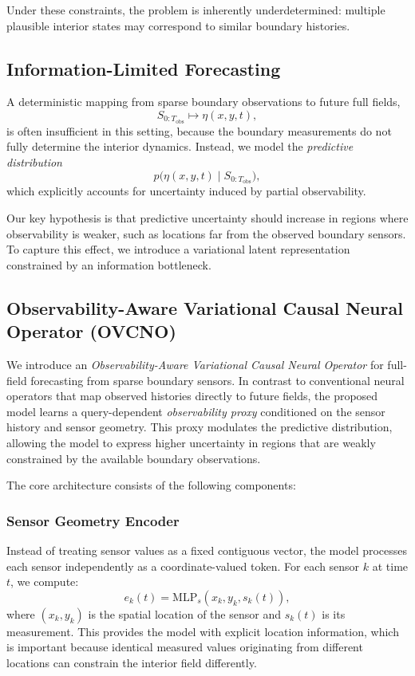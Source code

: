 \documentclass[11pt,a4paper]{article}
\begin{document}
Under these constraints, the problem is inherently underdetermined: multiple plausible interior states may correspond to similar boundary histories.

\subsection{Information-Limited Forecasting}

A deterministic mapping from sparse boundary observations to future full fields,
\begin{equation}
S_{0:T_{\mathrm{obs}}} \mapsto \eta(x,y,t),
\end{equation}
is often insufficient in this setting, because the boundary measurements do not fully determine the interior dynamics. Instead, we model the \emph{predictive distribution}
\begin{equation}
p\bigl(\eta(x,y,t)\mid S_{0:T_{\mathrm{obs}}}\bigr),
\end{equation}
which explicitly accounts for uncertainty induced by partial observability.

Our key hypothesis is that predictive uncertainty should increase in regions where observability is weaker, such as locations far from the observed boundary sensors. To capture this effect, we introduce a variational latent representation constrained by an information bottleneck.

\subsection{Observability-Aware Variational Causal Neural Operator (OVCNO)}

We introduce an \emph{Observability-Aware Variational Causal Neural Operator} for full-field forecasting from sparse boundary sensors. In contrast to conventional neural operators that map observed histories directly to future fields, the proposed model learns a query-dependent \emph{observability proxy} conditioned on the sensor history and sensor geometry. This proxy modulates the predictive distribution, allowing the model to express higher uncertainty in regions that are weakly constrained by the available boundary observations.

The core architecture consists of the following components:

\subsubsection{Sensor Geometry Encoder}
Instead of treating sensor values as a fixed contiguous vector, the model processes each sensor independently as a coordinate-valued token. For each sensor $k$ at time $t$, we compute:
\begin{equation}
e_k(t) = \mathrm{MLP}_s(x_k, y_k, s_k(t)),
\end{equation}
where $(x_k, y_k)$ is the spatial location of the sensor and $s_k(t)$ is its measurement. This provides the model with explicit location information, which is important because identical measured values originating from different locations can constrain the interior field differently.
\end{document}
